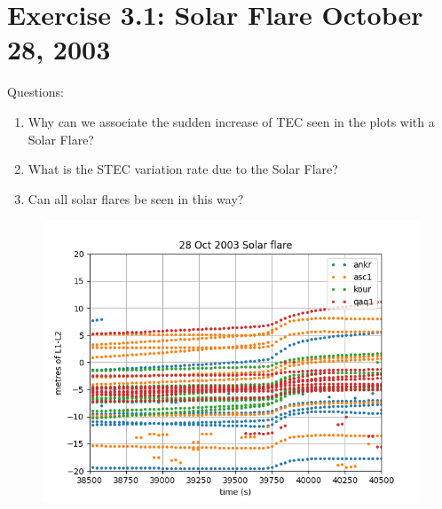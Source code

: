 \section{Exercise 3.1: Solar Flare October 28, 2003}

Questions:
\begin{enumerate}
\item Why can we associate the sudden increase of TEC seen in the plots with a Solar Flare?
\item What is the STEC variation rate due to the Solar Flare?
\item Can all solar flares be seen in this way?
\end{enumerate}



\begin{figure}[H]
        \centering
        \includegraphics[scale=0.52]{sources/Figures/FIG_2/TUT2_Ex3.1.png}
        \caption{}
        \label{fig:}
\end{figure}